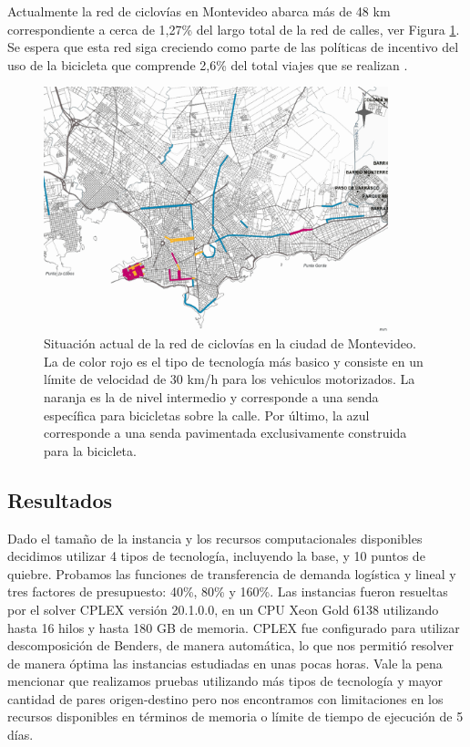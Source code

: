 Actualmente la red de ciclovías en Montevideo abarca más de 48 km correspondiente a cerca de 1,27\% del largo total de la red de calles, ver Figura \ref{fig:montevideobikeways}. Se espera que esta red siga creciendo como parte de las políticas de incentivo del uso de la bicicleta que comprende 2,6\% del total viajes que se realizan \cite{Mauttone2017a}.

\begin{figure}[h!]
  \centering
  \includegraphics[width=10cm]{../resources/bicicircuitos_montevideo.png}
  \caption{Situación actual de la red de ciclovías en la ciudad de Montevideo. La de color rojo es el tipo de tecnología más basico y consiste en un límite de velocidad de 30 km/h para los vehiculos motorizados. La naranja es la de nivel intermedio y corresponde a una senda específica para bicicletas sobre la calle. Por último, la azul corresponde a una senda pavimentada exclusivamente construida para la bicicleta.}
  \label{fig:montevideobikeways}
\end{figure}

\subsection{Resultados}

Dado el tamaño de la instancia y los recursos computacionales disponibles decidimos utilizar 4 tipos de tecnología, incluyendo la base, y 10 puntos de quiebre. Probamos las funciones de transferencia de demanda logística y lineal y tres factores de presupuesto: 40\%, 80\% y 160\%. Las instancias fueron resueltas por el solver CPLEX versión 20.1.0.0, en un CPU Xeon Gold 6138 utilizando hasta 16 hilos y hasta 180 GB de memoria. CPLEX fue configurado para utilizar descomposición de Benders, de manera automática, lo que nos permitió resolver de manera óptima las instancias estudiadas en unas pocas horas. Vale la pena mencionar que realizamos pruebas utilizando más tipos de tecnología y mayor cantidad de pares origen-destino pero nos encontramos con limitaciones en los recursos disponibles en términos de memoria o límite de tiempo de ejecución de 5 días.

